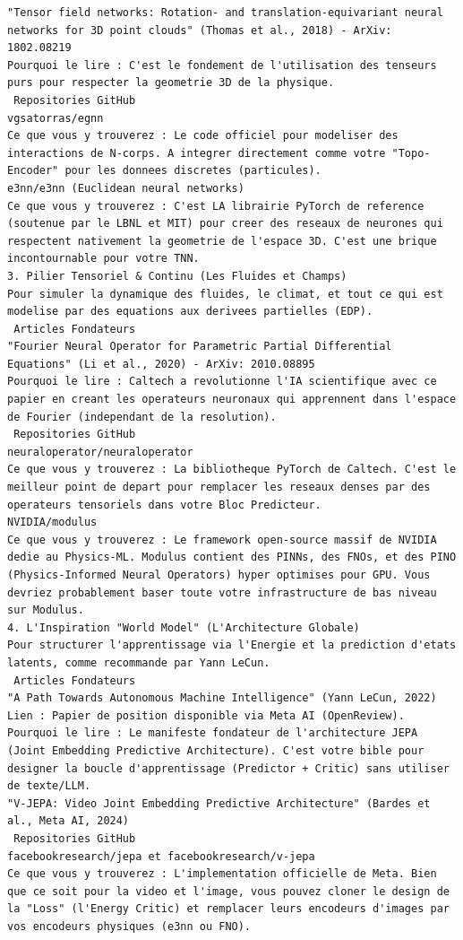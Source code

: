 \documentclass[11pt,a4paper]{article}
\begin{document}
\begin{lstlisting}[language={}, caption={}, basicstyle=\ttfamily\footnotesize, breaklines=true]
"Tensor field networks: Rotation- and translation-equivariant neural networks for 3D point clouds" (Thomas et al., 2018) - ArXiv: 1802.08219
Pourquoi le lire : C'est le fondement de l'utilisation des tenseurs purs pour respecter la geometrie 3D de la physique.
 Repositories GitHub
vgsatorras/egnn
Ce que vous y trouverez : Le code officiel pour modeliser des interactions de N-corps. A integrer directement comme votre "Topo-Encoder" pour les donnees discretes (particules).
e3nn/e3nn (Euclidean neural networks)
Ce que vous y trouverez : C'est LA librairie PyTorch de reference (soutenue par le LBNL et MIT) pour creer des reseaux de neurones qui respectent nativement la geometrie de l'espace 3D. C'est une brique incontournable pour votre TNN.
3. Pilier Tensoriel & Continu (Les Fluides et Champs)
Pour simuler la dynamique des fluides, le climat, et tout ce qui est modelise par des equations aux derivees partielles (EDP).
 Articles Fondateurs
"Fourier Neural Operator for Parametric Partial Differential Equations" (Li et al., 2020) - ArXiv: 2010.08895
Pourquoi le lire : Caltech a revolutionne l'IA scientifique avec ce papier en creant les operateurs neuronaux qui apprennent dans l'espace de Fourier (independant de la resolution).
 Repositories GitHub
neuraloperator/neuraloperator
Ce que vous y trouverez : La bibliotheque PyTorch de Caltech. C'est le meilleur point de depart pour remplacer les reseaux denses par des operateurs tensoriels dans votre Bloc Predicteur.
NVIDIA/modulus
Ce que vous y trouverez : Le framework open-source massif de NVIDIA dedie au Physics-ML. Modulus contient des PINNs, des FNOs, et des PINO (Physics-Informed Neural Operators) hyper optimises pour GPU. Vous devriez probablement baser toute votre infrastructure de bas niveau sur Modulus.
4. L'Inspiration "World Model" (L'Architecture Globale)
Pour structurer l'apprentissage via l'Energie et la prediction d'etats latents, comme recommande par Yann LeCun.
 Articles Fondateurs
"A Path Towards Autonomous Machine Intelligence" (Yann LeCun, 2022)
Lien : Papier de position disponible via Meta AI (OpenReview).
Pourquoi le lire : Le manifeste fondateur de l'architecture JEPA (Joint Embedding Predictive Architecture). C'est votre bible pour designer la boucle d'apprentissage (Predictor + Critic) sans utiliser de texte/LLM.
"V-JEPA: Video Joint Embedding Predictive Architecture" (Bardes et al., Meta AI, 2024)
 Repositories GitHub
facebookresearch/jepa et facebookresearch/v-jepa
Ce que vous y trouverez : L'implementation officielle de Meta. Bien que ce soit pour la video et l'image, vous pouvez cloner le design de la "Loss" (l'Energy Critic) et remplacer leurs encodeurs d'images par vos encodeurs physiques (e3nn ou FNO).

\end{lstlisting}
\end{document}
